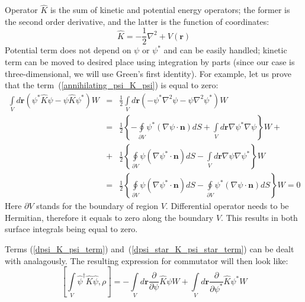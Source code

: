 \documentclass[12pt,notitlepage]{report}
\begin{document}
Operator $\hat{K}$ is the sum of kinetic and potential energy operators; the former is the second order derivative, and the latter is the function of coordinates:
\[ \hat{K} = - \frac{1}{2} \nabla^2 + V(\textbf{r}) \]
Potential term does not depend on $\psi$ or $\psi^*$ and can be easily handled; kinetic term can be moved to desired place using integration by parts (since our case is three-dimensional, we will use Green's first identity). For example, let us prove that the term~(\ref{annihilating_psi_K_psi}) is equal to zero:
\begin{eqnarray*}
\int\limits_V d\textbf{r} \left( \psi^* \hat{K} \psi - \psi \hat{K} \psi^* \right) W
& = & \frac{1}{2} \int\limits_V d\textbf{r} \left( - \psi^* \nabla^2 \psi - \psi \nabla^2 \psi^* \right) W \\
& = & \frac{1}{2} \left\{ - \oint\limits_{\partial V} \psi^* (\nabla \psi \cdot \textbf{n}) dS +
\int\limits_V d\textbf{r} \nabla \psi^* \nabla \psi \right\} W + \\
& + & \frac{1}{2} \left\{ \oint\limits_{\partial V} \psi (\nabla \psi^* \cdot \textbf{n}) dS -
\int\limits_V d\textbf{r} \nabla \psi \nabla \psi^* \right\} W \\
& = & \frac{1}{2} \left\{ \oint\limits_{\partial V} \psi (\nabla \psi^* \cdot \textbf{n}) dS -
\oint\limits_{\partial V} \psi^* (\nabla \psi \cdot \textbf{n}) dS \right\} W = 0
\end{eqnarray*}
Here $\partial V$ stands for the boundary of region $V$. Differential operator needs to be Hermitian, therefore it equals to zero along the boundary $V$. This results in both surface integrals being equal to zero. 

Terms (\ref{dpsi_K_psi_term}) and~(\ref{dpsi_star_K_psi_star_term}) can be dealt with analagously. The resulting expression for commutator will then look like:
\[
[ \int\limits_V \hat{\psi}^\dagger \hat{K} \hat{\psi}, \rho ]  = - \int\limits_V d\textbf{r} \frac{\partial}{\partial\psi} \hat{K} \psi W +
\int\limits_V d\textbf{r} \frac{\partial}{\partial\psi^*} \hat{K} \psi^* W
\]
\end{document}

